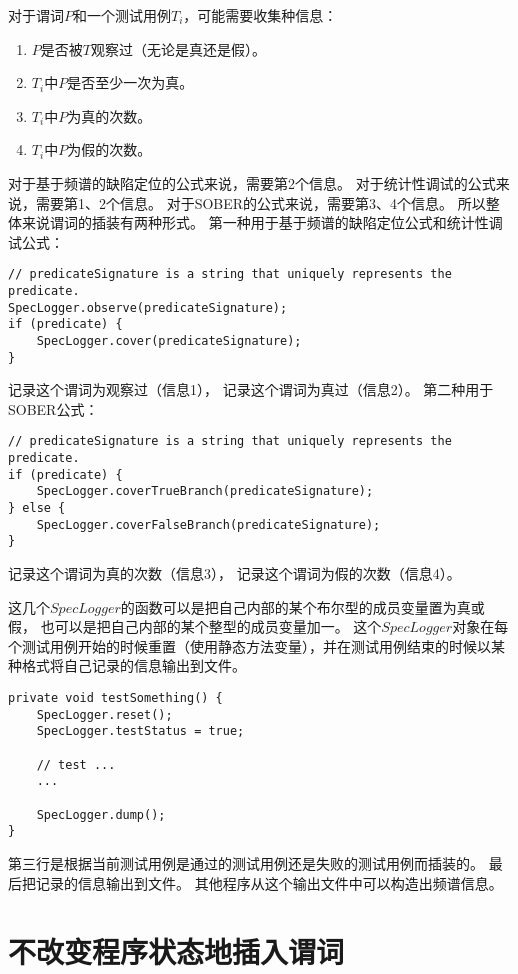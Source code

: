 对于谓词$P$和一个测试用例$T_i$，可能需要收集种信息：
\begin{enumerate}
\item $P$是否被$T$观察过（无论是真还是假）。
\item $T_i$中$P$是否至少一次为真。
\item $T_i$中$P$为真的次数。
\item $T_i$中$P$为假的次数。
\end{enumerate}

对于基于频谱的缺陷定位的公式来说，需要第2个信息。
对于统计性调试的公式来说，需要第1、2个信息。
对于SOBER的公式来说，需要第3、4个信息。
所以整体来说谓词的插装有两种形式。
第一种用于基于频谱的缺陷定位公式和统计性调试公式：
\lstset{language=Java}
\begin{lstlisting}
// predicateSignature is a string that uniquely represents the predicate.
SpecLogger.observe(predicateSignature);
if (predicate) {
    SpecLogger.cover(predicateSignature);
}
\end{lstlisting}
记录这个谓词为观察过（信息1），
记录这个谓词为真过（信息2）。
第二种用于SOBER公式：
\lstset{language=Java}
\begin{lstlisting}
// predicateSignature is a string that uniquely represents the predicate.
if (predicate) {
    SpecLogger.coverTrueBranch(predicateSignature);
} else {
    SpecLogger.coverFalseBranch(predicateSignature);
}
\end{lstlisting}
记录这个谓词为真的次数（信息3），
记录这个谓词为假的次数（信息4）。

这几个$SpecLogger$的函数可以是把自己内部的某个布尔型的成员变量置为真或假，
也可以是把自己内部的某个整型的成员变量加一。
这个$SpecLogger$对象在每个测试用例开始的时候重置（使用静态方法变量），并在测试用例结束的时候以某种格式将自己记录的信息输出到文件。
\lstset{language=Java}
\begin{lstlisting}
private void testSomething() {
	SpecLogger.reset();
    SpecLogger.testStatus = true;

    // test ...
    ...

    SpecLogger.dump();
}
\end{lstlisting}
第三行是根据当前测试用例是通过的测试用例还是失败的测试用例而插装的。
最后把记录的信息输出到文件。
其他程序从这个输出文件中可以构造出频谱信息。

\section{不改变程序状态地插入谓词}

